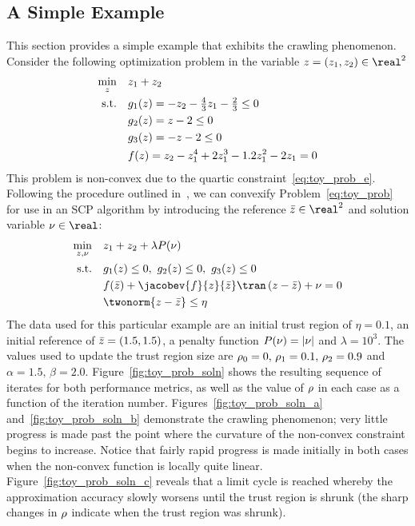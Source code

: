 \documentclass[letterpaper, 10 pt, conference]{ieeeconf}
\begin{document}
\subsection{A Simple Example}\label{subsec:toy_example}

This section provides a simple example that exhibits the crawling phenomenon. Consider the following optimization problem in the variable $\z=(z_1,z_2)\in\real^2$
\begin{subequations}\label{eq:toy_prob}
\begin{align}
\min_{z} &\quad z_1+z_2 \label{eq:toy_prob_a}\\
\text{s.t.} &\quad g_1(z) = -z_2 - \tfrac{4}{3} z_1 - \tfrac{2}{3} \leq 0 \label{eq:toy_prob_b}\\
&\quad g_2(z) = z - 2 \leq 0 \label{eq:toy_prob_c}\\
&\quad g_3(z) = -z - 2 \leq 0 \label{eq:toy_prob_d}\\
&\quad f(z) = z_2 - z_1^4 + 2z_1^3 - 1.2z_1^2 - 2z_1 = 0 \label{eq:toy_prob_e}
\end{align}
\end{subequations}
This problem is non-convex due to the quartic constraint~\eqref{eq:toy_prob_e}. Following the procedure outlined in~, we can convexify Problem~\eqref{eq:toy_prob} for use in an SCP algorithm by introducing the reference $\zb\in\real^2$ and solution variable $\vc\in\real$:
\begin{subequations}\label{eq:toy_prob_cvx}
\begin{align}
\min_{\z,\vc} &\quad z_1+z_2 + \lambda P(\vc) \\
\text{s.t.} &\quad \fc_1(\z) \leq 0,~\fc_2(\z)\leq0,~\fc_3(\z)\leq0 \\
&\quad \fne(\zb) + \jacobev{\fne}{z}{\zb}\tran\left( \z - \zb \right) + \vc = 0 \\
&\quad \twonorm{\z - \zb} \leq \eta
\end{align}
\end{subequations}
The data used for this particular example are an initial trust region of $\eta=0.1$, an initial reference of $\bar{z}=(1.5,1.5)$, a penalty function $P(\nu) = | \nu |$ and $\lambda=10^3$. The values used to update the trust region size are $\rho_0=0,\,\rho_1=0.1,\,\rho_2=0.9$ and $\alpha=1.5,\,\beta=2.0$. Figure~\ref{fig:toy_prob_soln} shows the resulting sequence of iterates for both performance metrics, as well as the value of $\rho$ in each case as a function of the iteration number. Figures~\ref{fig:toy_prob_soln_a} and~\ref{fig:toy_prob_soln_b} demonstrate the crawling phenomenon; very little progress is made past the point where the curvature of the non-convex constraint begins to increase. Notice that fairly rapid progress is made initially in both cases when the non-convex function is locally quite linear. Figure~\ref{fig:toy_prob_soln_c} reveals that a limit cycle is reached whereby the approximation accuracy slowly worsens until the trust region is shrunk (the sharp changes in $\rho$ indicate when the trust region was shrunk). 
\end{document}
